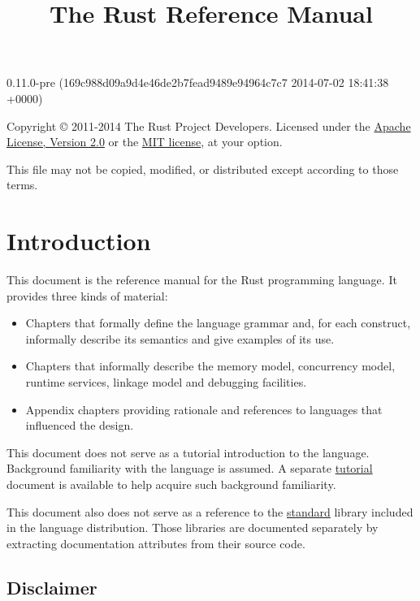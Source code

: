 \documentclass[]{article}
\title{The Rust Reference Manual}
\begin{document}
\maketitle

0.11.0-pre (169c988d09a9d4e46de2b7fead9489e94964c7c7 2014-07-02 18:41:38 +0000)

Copyright © 2011-2014 The Rust Project Developers. Licensed under the
\href{http://www.apache.org/licenses/LICENSE-2.0}{Apache License,
Version 2.0} or the \href{http://opensource.org/licenses/MIT}{MIT
license}, at your option.

This file may not be copied, modified, or distributed except according
to those terms.

{
\hypersetup{linkcolor=black}
\setcounter{tocdepth}{3}
\tableofcontents
}
\section{Introduction}\label{introduction}

This document is the reference manual for the Rust programming language.
It provides three kinds of material:

\begin{itemize}
\itemsep1pt\parskip0pt
\item
  Chapters that formally define the language grammar and, for each
  construct, informally describe its semantics and give examples of its
  use.
\item
  Chapters that informally describe the memory model, concurrency model,
  runtime services, linkage model and debugging facilities.
\item
  Appendix chapters providing rationale and references to languages that
  influenced the design.
\end{itemize}

This document does not serve as a tutorial introduction to the language.
Background familiarity with the language is assumed. A separate
\href{tutorial.html}{tutorial} document is available to help acquire
such background familiarity.

This document also does not serve as a reference to the
\href{std/index.html}{standard} library included in the language
distribution. Those libraries are documented separately by extracting
documentation attributes from their source code.

\subsection{Disclaimer}\label{disclaimer}
\end{document}
